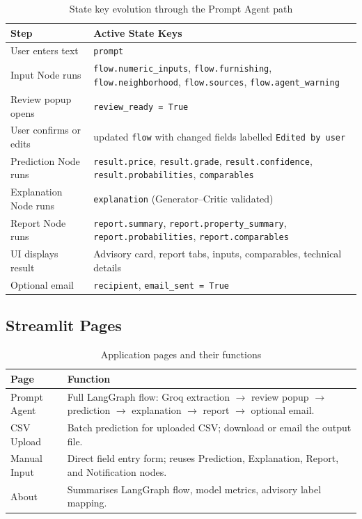 \documentclass[12pt,a4paper]{article}
\begin{document}
\begin{table}[H]
\centering
\caption{State key evolution through the Prompt Agent path}
\renewcommand{\arraystretch}{1.25}
\begin{tabularx}{\textwidth}{p{4cm}X}
\toprule
\textbf{Step} & \textbf{Active State Keys} \\
\midrule
User enters text          & \texttt{prompt} \\
Input Node runs           & \texttt{flow.numeric\_inputs}, \texttt{flow.furnishing}, \texttt{flow.neighborhood}, \texttt{flow.sources}, \texttt{flow.agent\_warning} \\
Review popup opens        & \texttt{review\_ready = True} \\
User confirms or edits    & updated \texttt{flow} with changed fields labelled \texttt{Edited by user} \\
Prediction Node runs      & \texttt{result.price}, \texttt{result.grade}, \texttt{result.confidence}, \texttt{result.probabilities}, \texttt{comparables} \\
Explanation Node runs     & \texttt{explanation} (Generator--Critic validated) \\
Report Node runs          & \texttt{report.summary}, \texttt{report.property\_summary}, \texttt{report.probabilities}, \texttt{report.comparables} \\
UI displays result        & Advisory card, report tabs, inputs, comparables, technical details \\
Optional email            & \texttt{recipient}, \texttt{email\_sent = True} \\
\bottomrule
\end{tabularx}
\end{table}

\subsection{Streamlit Pages}

\begin{table}[H]
\centering
\caption{Application pages and their functions}
\renewcommand{\arraystretch}{1.25}
\begin{tabularx}{\textwidth}{p{3cm}X}
\toprule
\textbf{Page} & \textbf{Function} \\
\midrule
Prompt Agent & Full LangGraph flow: Groq extraction $\to$ review popup $\to$ prediction $\to$ explanation $\to$ report $\to$ optional email. \\
CSV Upload   & Batch prediction for uploaded CSV; download or email the output file. \\
Manual Input & Direct field entry form; reuses Prediction, Explanation, Report, and Notification nodes. \\
About        & Summarises LangGraph flow, model metrics, advisory label mapping. \\
\bottomrule
\end{tabularx}
\end{table}
\end{document}
